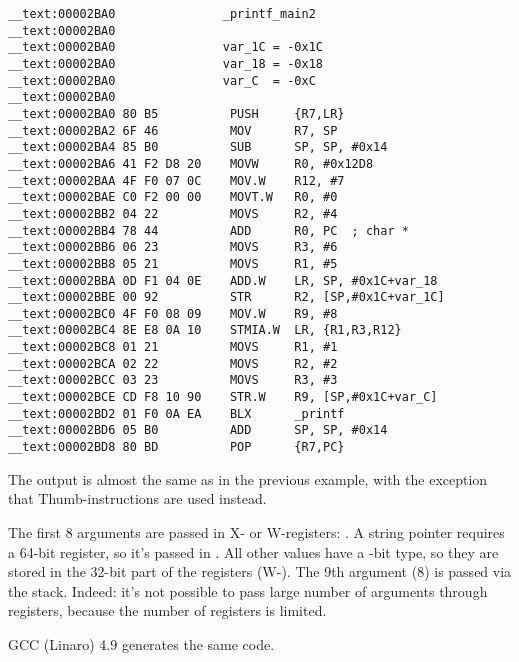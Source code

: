 \myparagraph{\OptimizingXcodeIV: \ThumbTwoMode}

\begin{lstlisting}[style=customasmARM]
__text:00002BA0               _printf_main2
__text:00002BA0
__text:00002BA0               var_1C = -0x1C
__text:00002BA0               var_18 = -0x18
__text:00002BA0               var_C  = -0xC
__text:00002BA0
__text:00002BA0 80 B5          PUSH     {R7,LR}
__text:00002BA2 6F 46          MOV      R7, SP
__text:00002BA4 85 B0          SUB      SP, SP, #0x14
__text:00002BA6 41 F2 D8 20    MOVW     R0, #0x12D8
__text:00002BAA 4F F0 07 0C    MOV.W    R12, #7
__text:00002BAE C0 F2 00 00    MOVT.W   R0, #0
__text:00002BB2 04 22          MOVS     R2, #4
__text:00002BB4 78 44          ADD      R0, PC  ; char *
__text:00002BB6 06 23          MOVS     R3, #6
__text:00002BB8 05 21          MOVS     R1, #5
__text:00002BBA 0D F1 04 0E    ADD.W    LR, SP, #0x1C+var_18
__text:00002BBE 00 92          STR      R2, [SP,#0x1C+var_1C]
__text:00002BC0 4F F0 08 09    MOV.W    R9, #8
__text:00002BC4 8E E8 0A 10    STMIA.W  LR, {R1,R3,R12}
__text:00002BC8 01 21          MOVS     R1, #1
__text:00002BCA 02 22          MOVS     R2, #2
__text:00002BCC 03 23          MOVS     R3, #3
__text:00002BCE CD F8 10 90    STR.W    R9, [SP,#0x1C+var_C]
__text:00002BD2 01 F0 0A EA    BLX      _printf
__text:00002BD6 05 B0          ADD      SP, SP, #0x14
__text:00002BD8 80 BD          POP      {R7,PC}
\end{lstlisting}

The output is almost the same as in the previous example, with the exception that Thumb-instructions are used instead.





The first 8 arguments are passed in X- or W-registers: \ARMPCS.
A string pointer requires a 64-bit register, so it's passed in .
All other values have a -bit type, so they are stored in the 32-bit part of the registers (W-).
The 9th argument (8) is passed via the stack.
Indeed: it's not possible to pass large number of arguments through registers, because the number of registers is limited.

\Optimizing GCC (Linaro) 4.9 generates the same code.
